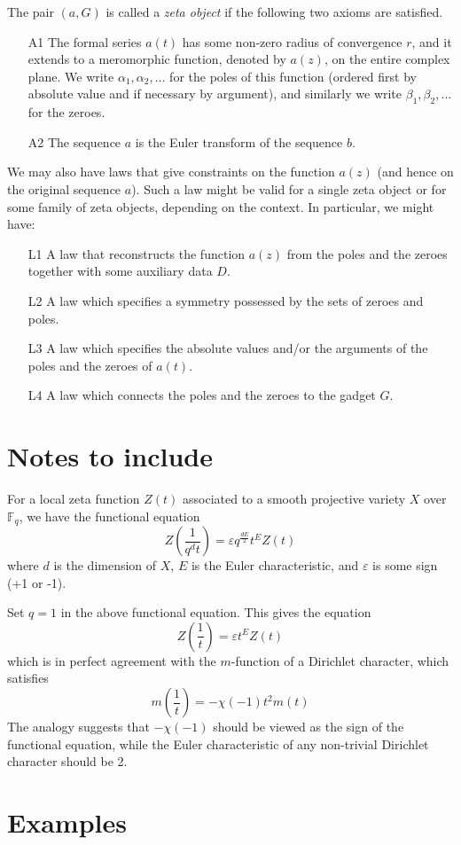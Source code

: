 \documentclass[paper=a4, fontsize=11pt]{scrartcl} %
\numberwithin{equation}{section} %
\numberwithin{figure}{section} %
\numberwithin{table}{section} %
\begin{document}
The pair $(a, G)$ is called a \emph{zeta object} if the following two axioms are satisfied.
\begin{itemize}
\item[A1] The formal series $a(t)$ has some non-zero radius of convergence $r$, and it extends to a meromorphic function, denoted by $a(z)$, on the entire complex plane. We write $\alpha_1, \alpha_2, \ldots$ for the poles of this function (ordered first by absolute value and if necessary by argument), and similarly we write $\beta_1, \beta_2, \ldots$ for the zeroes.
\item[A2] The sequence $a$ is the Euler transform of the sequence $b$.
\end{itemize}

We may also have laws that give constraints on the function $a(z)$ (and hence on the original sequence $a$). Such a law might be valid for a single zeta object or for some family of zeta objects, depending on the context. In particular, we might have:

\begin{itemize}
\item[L1] A law that reconstructs the function $a(z)$ from the poles and the zeroes together with some auxiliary data $D$.
\item[L2] A law which specifies a symmetry possessed by the sets of zeroes and poles.
\item[L3] A law which specifies the absolute values and/or the arguments of the poles and the zeroes of $a(t)$.
\item[L4] A law which connects the poles and the zeroes to the gadget $G$.
\end{itemize}



\section{Notes to include}

For a local zeta function $Z(t)$ associated to a smooth projective variety $X$ over $\mathbb{F}_q$, we have the functional equation
$$  Z \left( \frac{1}{q^d t} \right) = \varepsilon q^{\frac{dE}{2}} t^E Z(t) $$
where $d$ is the dimension of $X$, $E$ is the Euler characteristic, and $\varepsilon$ is some sign (+1 or -1).

Set $q=1$ in the above functional equation. This gives the equation
$$  Z \left( \frac{1}{t} \right) = \varepsilon t^E Z(t) $$
which is in perfect agreement with the $m$-function of a Dirichlet character, which satisfies
$$  m \left( \frac{1}{t} \right) = -\chi(-1) t^2 m(t) $$
The analogy suggests that $-\chi(-1)$ should be viewed as the sign of the functional equation, while the Euler characteristic of any non-trivial Dirichlet character should be 2.

\section{Examples}





\end{document}
